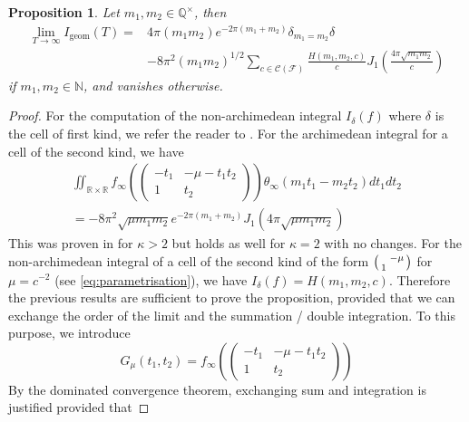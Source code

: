 \documentclass{article}
\newtheorem{proposition}[theorem]{Proposition}
\numberwithin{equation}{section}
\begin{document}
\begin{proposition}\label{prop:geometric-limit}
    Let $m_1,m_2 \in \mathbb{Q}^\times$, then 
    \begin{equation}
        \begin{split}
        \lim_{T \to \infty}I_{\operatorname{geom}}(T)= & 4\pi(m_1m_2)e^{-2\pi(m_1+m_2)}\delta_{m_1=m_2}\delta\\ & -8\pi^2(m_1m_2)^{1/2}\sum_{c \in \mathcal{C}(\mathcal{F})}\frac{H(m_1,m_2,c)}{c}J_1\left(\frac{4\pi\sqrt{m_1m_2}}{c}\right)
        \end{split}
    \end{equation}
    if $m_1,m_2 \in \mathbb{N}$, and vanishes otherwise.
\end{proposition}
\begin{proof}
For the computation of the non-archimedean integral $I_\delta(f)$ where $\delta$ is the cell of first kind, we refer the reader to \cite[\S 4.2]{generalised} . For the archimedean integral for a cell of the second kind, we have
\begin{equation}
    \begin{split}
\iint_{\mathbb{R}\times \mathbb{R}}f_\infty(\begin{pmatrix}
    -t_1 & -\mu-t_1t_2 \\ 1 & t_2
\end{pmatrix})\theta_\infty(m_1t_1-m_2t_2)dt_1dt_2 \\ 
= -8\pi^2\sqrt{\mu m_1m_2}e^{-2\pi(m_1+m_2)}J_1(4\pi\sqrt{\mu m_1m_2})
    \end{split}
    \end{equation}
This was proven in \cite[Proposition 3.6]{KL-petersson} for $\kappa > 2$ but holds as well for $\kappa=2$ with no changes. For the non-archimedean integral of a cell of the second kind of the form $\begin{psmallmatrix}
    & -\mu \\ 1 &
\end{psmallmatrix}$ for $\mu=c^{-2}$ (see \eqref{eq:parametrisation}), we have $I_\delta(f)=H(m_1,m_2,c)$. Therefore the previous results are sufficient to prove the proposition, provided that we can exchange the order of the limit and the summation / double integration. To this purpose, we introduce 
    $$ G_\mu(t_1,t_2)=f_\infty (\begin{pmatrix}
        -t_1 & -\mu-t_1t_2 \\ 1 & t_2
    \end{pmatrix} )$$
    By the dominated convergence theorem, exchanging sum and integration is justified provided that 

\end{proof}
\end{document}
